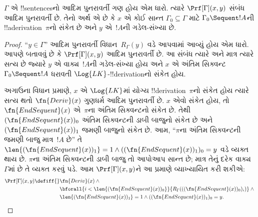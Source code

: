 \documentclass[../../../include/open-logic-section]{subfiles}
\begin{document}
\begin{prop}
$\Gamma$ એ !!{sentence}sનો આદિમ
પુનરાવર્તી ગણ હોય એમ ધારો. ત્યારે
$\Prf[\Gamma](x, y)$ સંબંધ આદિમ
પુનરાવર્તી છે. તેનો અર્થ એ છે કે
$x$ એ કોઈ સાન્ત
$\Gamma_0 \subseteq \Gamma$ માટે
$\Gamma_0 \Sequent !A$ની
!!a{derivation}~$\pi$નો સંકેત છે અને
$y$ એ~$!A$ની ગડેલ-સંખ્યા છે.
\end{prop}

\begin{proof}
``$y \in \Gamma$'' આદિમ પુનરાવર્તી
વિધાન~$R_\Gamma(y)$ વડે આપવામાં
આવ્યું હોય એમ ધારો. આપણે બતાવવું છે
કે $\Prf[\Gamma](x, y)$ આદિમ
પુનરાવર્તી છે. આ સંબંધ ત્યારે અને
માત્ર ત્યારે સત્ય છે જ્યારે $y$ એ
વાક્ય~$!A$ની ગડેલ-સંખ્યા
હોય અને $x$ એ અંતિમ સિક્વન્ટ
$\Gamma_0 \Sequent !A$ ધરાવતી
$\Log{LK}$-!!{derivation}નો સંકેત હોય.

અગાઉના વિધાન પ્રમાણે, $x$ એ
$\Log{LK}$માં યોગ્ય
!!{derivation}~$\pi$નો સંકેત હોય
ત્યારે સત્ય થતો
$\fn{Deriv}(x)$ ગુણધર્મ આદિમ
પુનરાવર્તી છે. $x$ એવો સંકેત હોય,
તો $\fn{EndSequent}(x)$ એ~$\pi$ના
અંતિમ સિક્વન્ટનો સંકેત છે. તેથી
$(\fn{EndSequent}(x))_0$ અંતિમ
સિક્વન્ટની ડાબી બાજુનો સંકેત છે
અને $(\fn{EndSequent}(x))_1$
જમણી બાજુનો સંકેત છે. આમ,
``$\pi$ના અંતિમ સિક્વન્ટની જમણી
બાજુ માત્ર~$!A$ છે'' તે
$\len{(\fn{EndSequent}(x))_1} = 1
\land ((\fn{EndSequent}(x))_1)_0 = y$
વડે વ્યક્ત થાય છે.
$\pi$ના અંતિમ સિક્વન્ટની ડાબી
બાજુ તો આપોઆપ સાન્ત છે; માત્ર
તેનું દરેક વાક્ય~$\Gamma$માં છે
તે વ્યક્ત કરવું પડે. આમ
$\Prf[\Gamma](x, y)$ને આ પ્રમાણે
વ્યાખ્યાયિત કરી શકીએ:
\begin{align*}
\Prf[\Gamma](x, y) \defiff {}&
\fn{Deriv}(x) \land {} \\
& \bforall{i <
  \len{(\fn{EndSequent}(x))_0}}{R_\Gamma(((\fn{EndSequent}(x))_0)_i)} \land {}\\
& \len{(\fn{EndSequent}(x))_1} = 1 \land ((\fn{EndSequent}(x))_1)_0 = y.
\end{align*}
\end{proof}
\end{document}
